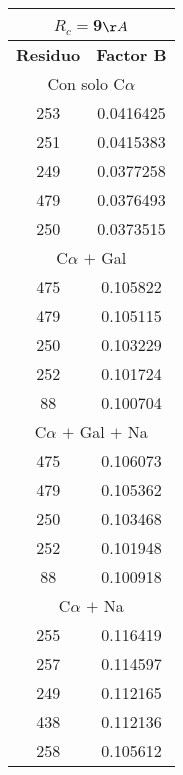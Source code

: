 \begin{tabular}[c]{|c|c|}
\multicolumn{2}{c}{$R_c=$9$\AA$}\\\hline
\textbf{Residuo}&\textbf{Factor B}\\\hline
\multicolumn{2}{c}{Con solo C$\alpha$}\\\hline
       253& 0.0416425\\
       251& 0.0415383\\
       249& 0.0377258\\
       479& 0.0376493\\
       250& 0.0373515\\\hline
\multicolumn{2}{c}{C$\alpha$ $+$ Gal}\\\hline
       475&  0.105822\\
       479&  0.105115\\
       250&  0.103229\\
       252&  0.101724\\
        88&  0.100704\\\hline
\multicolumn{2}{c}{C$\alpha$ $+$ Gal $+$ Na}\\\hline
       475&  0.106073\\
       479&  0.105362\\
       250&  0.103468\\
       252&  0.101948\\
        88&  0.100918\\\hline
\multicolumn{2}{c}{C$\alpha$ $+$ Na}\\\hline
       255&  0.116419\\
       257&  0.114597\\
       249&  0.112165\\
       438&  0.112136\\
       258&  0.105612\\\hline
\end{tabular}
